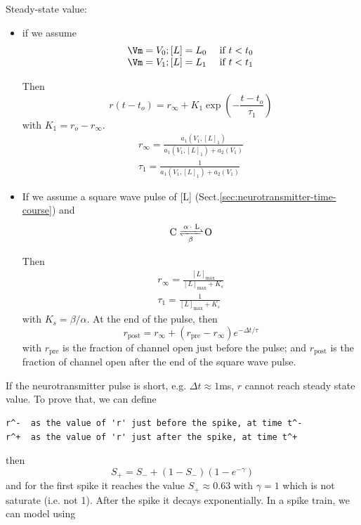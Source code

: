 Steady-state value:
\begin{itemize}
  \item if we assume 
\begin{equation}
\begin{array}{cc}
\Vm = V_0; [L]=L_0 & \text{ if } t < t_0 \\
\Vm = V_1; [L]=L_1 & \text{ if } t < t_1 \\
\end{array}
\end{equation}

Then
\begin{equation}
r(t-t_o) = r_\infty + K_1 \exp(-\frac{t-t_o}{\tau_1})
\end{equation}
with $K_1 = r_o - r_\infty$.
\begin{equation}
\begin{split}
r_\infty = \frac{a_1(V_1,[L]_1)}{a_1(V_1,[L]_1)+a_2 (V_1)} \\
\tau_1 = \frac{1}{a_1(V_1,[L]_1)+a_2 (V_1)}
\end{split}
\end{equation}

  \item If we assume a square wave pulse of [L] (Sect.\ref{sec:neurotransmitter-time-course})
and
\begin{equation}
\ce{C <=>[\alpha . L][\beta ] O}
\end{equation}

\def\pre{{\text{pre}}}
\def\post{{\text{post}}}

Then
\begin{equation}
\begin{split}
r_\infty = \frac{[L]_\max}{[L]_\max+K_s} \\
\tau_1 = \frac{1}{[L]_\max+K_s}
\end{split}
\end{equation}
with $K_s = \beta/\alpha$. At the end of the pulse, then 
\begin{equation}
r_\post = r_\infty + (r_\pre - r_\infty) e^{-\Delta t/\tau}
\end{equation}
with $r_\pre$ is the fraction of channel open just before the pulse; and 
$r_\post$ is the fraction of channel open after the end of the square wave
pulse.

\end{itemize}

If the neurotransmitter pulse is short, e.g. $\Delta t \approx 1$ms, 
$r$ cannot reach steady state value. To prove that, we can define
\begin{verbatim}
r^-  as the value of 'r' just before the spike, at time t^-
r^+  as the value of 'r' just after the spike, at time t^+
\end{verbatim}
then
\begin{equation}
S_+ = S_- + (1 - S_- ) (1- e^{-\gamma})
\end{equation}
and for the first spike it reaches the value
$S_+ \approx 0.63$ with $\gamma = 1$ which is not saturate (i.e. not 1).
After the spike it decays exponentially. In a spike train, we can model using

